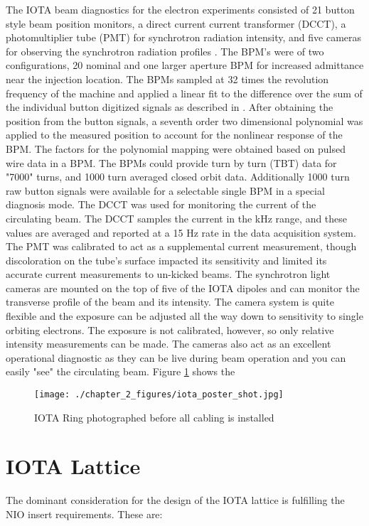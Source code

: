 The IOTA beam diagnostics for the electron experiments consisted of 21 button style beam position monitors, a direct current current transformer (DCCT), a photomultiplier tube (PMT) for synchrotron radiation intensity, and five cameras for observing the synchrotron radiation profiles \cite{eddyBeamInstrumentationFermilab2019}. The BPM's were of two configurations, 20 nominal and one larger aperture BPM for increased admittance near the injection location. The BPMs sampled at 32 times the revolution frequency of the machine and applied a linear fit to the difference over the sum of the individual button digitized signals as described in \cite{reiterStatisticalTreatmentBeam2018}. After obtaining the position from the button signals, a seventh order two dimensional polynomial was applied to the measured position to account for the nonlinear response of the BPM. The factors for the polynomial mapping were obtained based on pulsed wire data in a BPM. The BPMs could provide turn by turn (TBT) data for "7000" turns, and 1000 turn averaged closed orbit data. Additionally 1000 turn raw button signals were available for a selectable single BPM in a special diagnosis mode. The DCCT was used for monitoring the current of the circulating beam. The DCCT samples the current in the kHz range, and these values are averaged and reported at a 15 Hz rate in the data acquisition system. The PMT was calibrated to act as a supplemental current measurement, though discoloration on the tube's surface impacted its sensitivity and limited its accurate current measurements to un-kicked beams. The synchrotron light cameras are mounted on the top of five of the IOTA dipoles and can monitor the transverse profile of the beam and its intensity. The camera system is quite flexible and the exposure can be adjusted all the way down to sensitivity to single orbiting electrons. The exposure is not calibrated, however, so only relative intensity measurements can be made. The cameras also act as an excellent operational diagnostic as they can be live during beam operation and you can easily "see" the circulating beam. Figure \ref{fig:iotaPhoto} shows the


\begin{figure}
	\centering
	\texttt{[image: ./chapter\_2\_figures/iota\_poster\_shot.jpg]}
	\caption{IOTA Ring photographed before all cabling is installed}
	\label{fig:iotaPhoto}
\end{figure}

\section{IOTA Lattice}
The dominant consideration for the design of the IOTA lattice is fulfilling the NIO insert requirements. These are:

